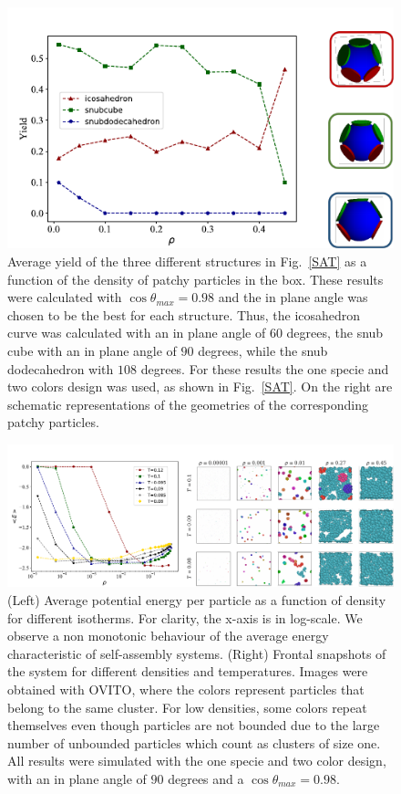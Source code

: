 \documentclass[a4paper, amsfonts, amssymb, amsmath, reprint, showkeys, nofootinbib, twoside]{revtex4-1}
\begin{document}
\begin{figure}[t]
	\includegraphics{fig4.pdf}
	\caption{\label{Yield} Average yield of the three different structures in Fig.~\ref{SAT} as a function of the density of patchy particles in the box. These results were calculated with $\cos\theta_{max}=0.98$ and the in plane angle was chosen to be the best for each structure. Thus, the icosahedron curve was calculated with an in plane angle of $60$ degrees, the snub cube with an in plane angle of $90$ degrees, while the snub dodecahedron with $108$ degrees. For these results the one specie and two colors design was used, as shown in Fig.~\ref{SAT}. On the right are schematic representations of the geometries of the corresponding patchy particles. }
\end{figure}

\begin{figure}[t]
	\includegraphics{fig5.pdf}
	\caption{\label{Energy} (Left) Average potential energy per particle as a function of density for different isotherms. For clarity, the x-axis is in log-scale. We observe a non monotonic behaviour of the average energy characteristic of self-assembly systems. (Right) Frontal snapshots of the system for different densities and temperatures. Images were obtained with OVITO, where the colors represent particles that belong to the same cluster. For low densities, some colors repeat themselves even though particles are not bounded due to the large number of unbounded particles which count as clusters of size one. All results were simulated with the one specie and two color design, with an in plane angle of $90$ degrees and a $\cos\theta_{max}=0.98$.}
\end{figure}
\end{document}
